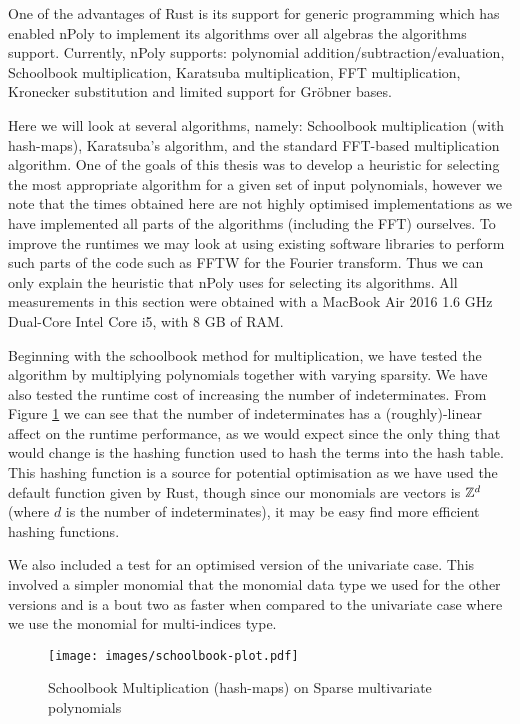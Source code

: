 One of the advantages of Rust is its support for generic programming which has enabled nPoly to implement its algorithms over all algebras the algorithms support. Currently, nPoly supports: polynomial addition/subtraction/evaluation, Schoolbook multiplication, Karatsuba multiplication, FFT multiplication, Kronecker substitution and limited support for Gr\"{o}bner bases.

Here we will look at several algorithms, namely: Schoolbook multiplication (with hash-maps), Karatsuba's algorithm, and the standard FFT-based multiplication algorithm. One of the goals of this thesis was to develop a heuristic for selecting the most appropriate algorithm for a given set of input polynomials, however we note that the times obtained here are not highly optimised implementations as we have implemented all parts of the algorithms (including the FFT) ourselves. To improve the runtimes we may look at using existing software libraries to perform such parts of the code such as FFTW for the Fourier transform. Thus we can only explain the heuristic that nPoly uses for selecting its algorithms. All measurements in this section were obtained with a MacBook Air 2016 1.6 GHz Dual-Core Intel Core i5, with 8 GB of RAM. 

Beginning with the schoolbook method for multiplication, we have tested the algorithm by multiplying polynomials together with varying sparsity. We have also tested the runtime cost of increasing the number of indeterminates. From Figure \ref{fig:schoolbook} we can see that the number of indeterminates has a (roughly)-linear affect on the runtime performance, as we would expect since the only thing that would change is the hashing function used to hash the terms into the hash table. This hashing function is a source for potential optimisation as we have used the default function given by Rust, though since our monomials are vectors is ${\mathbb Z}^d$ (where $d$ is the number of indeterminates), it may be easy find more efficient hashing functions.

We also included a test for an optimised version of the univariate case. This involved a simpler monomial that the monomial data type we used for the other versions and is a bout two as faster when compared to the univariate case where we use the monomial for multi-indices type.

\begin{figure}[h!]
    \centering
    \texttt{[image: images/schoolbook-plot.pdf]}
    \caption{Schoolbook Multiplication (hash-maps) on Sparse multivariate polynomials}
    \label{fig:schoolbook}
\end{figure}

